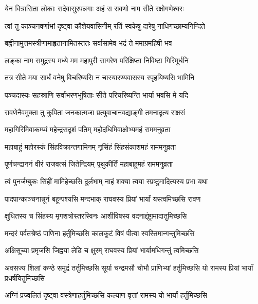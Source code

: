 \twolineshloka
{येन वित्रासिता लोकाः सदेवासुरपन्नगाः}
{अहं स रावणो नाम सीते रक्षोगणेश्वरः} %

\twolineshloka
{त्वां तु काञ्चनवर्णाभां दृष्ट्वा कौशेयवासिनीम्}
{रतिं स्वकेषु दारेषु नाधिगच्छाम्यनिन्दिते} %

\twolineshloka
{बह्वीनामुत्तमस्त्रीणामाहृतानामितस्ततः}
{सर्वासामेव भद्रं ते ममाग्रमहिषी भव} %

\twolineshloka
{लङ्का नाम समुद्रस्य मध्ये मम महापुरी}
{सागरेण परिक्षिप्ता निविष्टा गिरिमूर्धनि} %

\twolineshloka
{तत्र सीते मया सार्धं वनेषु विचरिष्यसि}
{न चास्यारण्यवासस्य स्पृहयिष्यसि भामिनि} %

\twolineshloka
{पञ्चदास्यः सहस्राणि सर्वाभरणभूषिताः}
{सीते परिचरिष्यन्ति भार्या भवसि मे यदि} %

\twolineshloka
{रावणेनैवमुक्ता तु कुपिता जनकात्मजा}
{प्रत्युवाचानवद्याङ्गी तमनादृत्य राक्षसं} %

\twolineshloka
{महागिरिमिवाकम्प्यं महेन्द्रसदृशं पतिम्}
{महोदधिमिवाक्षोभ्यमहं राममनुव्रता} %

\twolineshloka
{महाबाहुं महोरस्कं सिंहविक्रान्तगामिनम्}
{नृसिंहं सिंहसंकाशमहं राममनुव्रता} %

\twolineshloka
{पूर्णचन्द्राननं वीरं राजवत्सं जितेन्द्रियम्}
{पृथुकीर्तिं महाबाहुमहं राममनुव्रता} %

\twolineshloka
{त्वं पुनर्जम्बुकः सिंहीं मामिहेच्छसि दुर्लभाम्}
{नाहं शक्या त्वया स्प्रष्टुमादित्यस्य प्रभा यथा} %

\twolineshloka
{पादपान्काञ्चनान्नूनं बहून्पश्यसि मन्दभाक्}
{राघवस्य प्रियां भार्यां यस्त्वमिच्छसि रावण} %

\twolineshloka
{क्षुधितस्य च सिंहस्य मृगशत्रोस्तरस्विनः}
{आशीविषस्य वदनाद्दंष्ट्रामादातुमिच्छसि} %

\twolineshloka
{मन्दरं पर्वतश्रेष्ठं पाणिना हर्तुमिच्छसि}
{कालकूटं विषं पीत्वा स्वस्तिमान्गन्तुमिच्छसि} %

\twolineshloka
{अक्षिसूच्या प्रमृजसि जिह्वया लेढि च क्षुरम्}
{राघवस्य प्रियां भार्यामधिगन्तुं त्वमिच्छसि} %

\threelineshloka
{अवसज्य शिलां कण्ठे समुद्रं तर्तुमिच्छसि}
{सूर्या चन्द्रमसौ चोभौ प्राणिभ्यां हर्तुमिच्छसि}
{यो रामस्य प्रियां भार्यां प्रधर्षयितुमिच्छसि} %

\twolineshloka
{अग्निं प्रज्वलितं दृष्ट्वा वस्त्रेणाहर्तुमिच्छसि}
{कल्याण वृत्तां रामस्य यो भार्यां हर्तुमिच्छसि} %

